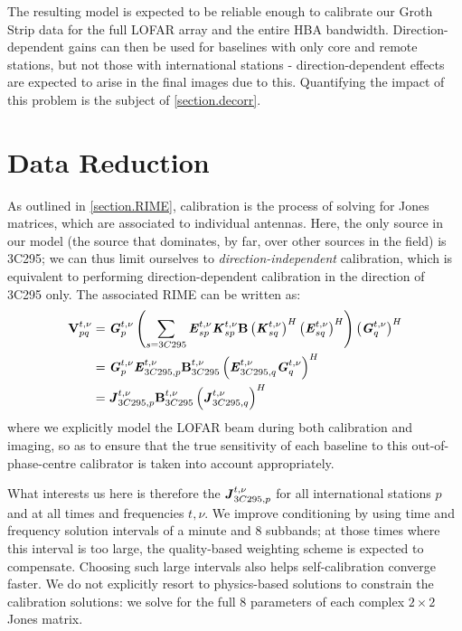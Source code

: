 \pg
The resulting model is expected to be reliable enough to calibrate our Groth Strip data for the full LOFAR array and the entire HBA bandwidth. Direction-dependent gains can then be used for baselines with only core and remote stations, but not those with international stations - direction-dependent effects are expected to arise in the final images due to this. Quantifying the impact of this problem is the subject of \cref{section.decorr}.

\section{Data Reduction}

\pg
As outlined in \cref{section.RIME}, calibration is the process of solving for Jones matrices, which are associated to individual antennas. Here, the only source in our model (the source that dominates, by far, over other sources in the field) is 3C295; we can thus limit ourselves to \textit{direction-independent} calibration, which is equivalent to performing direction-dependent calibration in the direction of 3C295 only. The associated RIME can be written as:
\begin{align}
\textbf{V}_{pq}^{t,\nu} &= \textbf{\emph{G}}_p^{t,\nu} \left( \sum_{s=3C295} \textbf{\emph{E}}_{sp}^{t,\nu} \textbf{\emph{K}}_{sp}^{t,\nu} \textbf{B} \left(\textbf{\emph{K}}_{sq}^{t,\nu}\right)^H \left(\textbf{\emph{E}}_{sq}^{t,\nu}\right)^H \right) \left(\textbf{\emph{G}}_q^{t,\nu}\right)^H\\
		  &= \textbf{\emph{G}}_p^{t,\nu} \textbf{\emph{E}}_{3C295,p}^{t,\nu} \textbf{B}_{3C295}^{t,\nu} \left(\textbf{\emph{E}}_{3C295,q}^{t,\nu} \textbf{\emph{G}}_q^{t,\nu}\right)^H\\
		  &= \textbf{\emph{J}}_{3C295,p}^{t,\nu} \textbf{B}_{3C295}^{t,\nu} \left(\textbf{\emph{J}}_{3C295,q}^{t,\nu}\right)^H\label{3c295.dirin.cal}
\end{align}
where we explicitly model the LOFAR beam during both calibration and imaging, so as to ensure that the true sensitivity of each baseline to this out-of-phase-centre calibrator is taken into account appropriately.

\pg
What interests us here is therefore the $\textbf{\emph{J}}_{3C295,p}^{t,\nu}$ for all international stations $p$ and at all times and frequencies $t,\nu$. We improve conditioning by using time and frequency solution intervals of a minute and 8 subbands; at those times where this interval is too large, the quality-based weighting scheme is expected to compensate. Choosing such large intervals also helps self-calibration converge faster. We do not explicitly resort to physics-based solutions to constrain the calibration solutions: we solve for the full 8 parameters of each complex $2\times 2$ Jones matrix.

